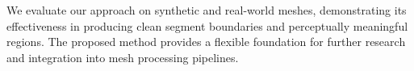 \documentclass[11pt]{article}
\begin{document}
We evaluate our approach on synthetic and real-world meshes, demonstrating its effectiveness in producing clean segment boundaries and perceptually meaningful regions. The proposed method provides a flexible foundation for further research and integration into mesh processing pipelines.

\end{document}
